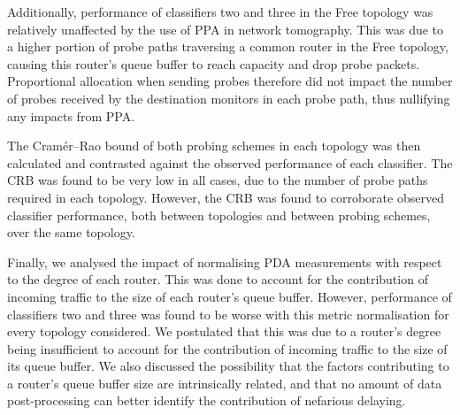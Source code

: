 Additionally, performance of classifiers two and three in the Free topology was relatively unaffected by the use of PPA in network tomography. This was due to a higher portion of probe paths traversing a common router in the Free topology, causing this router's queue buffer to reach capacity and drop probe packets. Proportional allocation when sending probes therefore did not impact the number of probes received by the destination monitors in each probe path, thus nullifying any impacts from PPA.\par
The Cramér–Rao bound of both probing schemes in each topology was then calculated and contrasted against the observed performance of each classifier. The CRB was found to be very low in all cases, due to the number of probe paths required in each topology. However, the CRB was found to corroborate observed classifier performance, both between topologies and between probing schemes, over the same topology.\par
Finally, we analysed the impact of normalising PDA measurements with respect to the degree of each router. This was done to account for the contribution of incoming traffic to the size of each router's queue buffer. However, performance of classifiers two and three was found to be worse with this metric normalisation for every topology considered. We postulated that this was due to a router's degree being insufficient to account for the contribution of incoming traffic to the size of its queue buffer. We also discussed the possibility that the factors contributing to a router's queue buffer size are intrinsically related, and that no amount of data post-processing can better identify the contribution of nefarious delaying.